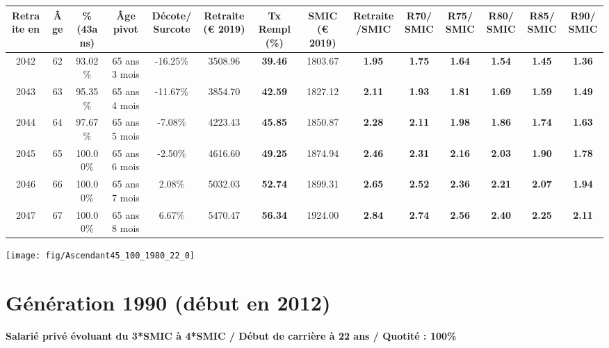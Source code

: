 \begin{adjustbox}{max width=\textwidth} 
\begin{tabular}[htb]{|c|c||c|c|c||c|c||c|c||c|c|c|c|c|} 
\hline 
 Retraite en &  Âge &  \%(43ans) &  Âge pivot &  Décote/Surcote &  Retraite (\euro{} 2019) &  Tx Rempl(\%) &  SMIC (\euro{} 2019) &  Retraite/SMIC &  R70/SMIC &  R75/SMIC &  R80/SMIC &  R85/SMIC &  R90/SMIC \\ 
\hline \hline 
 2042 &  62 &  93.02\% &  65 ans 3 mois &  -16.25\% &  3508.96 &  {\bf 39.46} &  1803.67 &  {\bf 1.95} &  {\bf 1.75} &  {\bf 1.64} &  {\bf 1.54} &  {\bf 1.45} &  {\bf 1.36} \\ 
\hline 
 2043 &  63 &  95.35\% &  65 ans 4 mois &  -11.67\% &  3854.70 &  {\bf 42.59} &  1827.12 &  {\bf 2.11} &  {\bf 1.93} &  {\bf 1.81} &  {\bf 1.69} &  {\bf 1.59} &  {\bf 1.49} \\ 
\hline 
 2044 &  64 &  97.67\% &  65 ans 5 mois &  -7.08\% &  4223.43 &  {\bf 45.85} &  1850.87 &  {\bf 2.28} &  {\bf 2.11} &  {\bf 1.98} &  {\bf 1.86} &  {\bf 1.74} &  {\bf 1.63} \\ 
\hline 
 2045 &  65 &  100.00\% &  65 ans 6 mois &  -2.50\% &  4616.60 &  {\bf 49.25} &  1874.94 &  {\bf 2.46} &  {\bf 2.31} &  {\bf 2.16} &  {\bf 2.03} &  {\bf 1.90} &  {\bf 1.78} \\ 
\hline 
 2046 &  66 &  100.00\% &  65 ans 7 mois &  2.08\% &  5032.03 &  {\bf 52.74} &  1899.31 &  {\bf 2.65} &  {\bf 2.52} &  {\bf 2.36} &  {\bf 2.21} &  {\bf 2.07} &  {\bf 1.94} \\ 
\hline 
 2047 &  67 &  100.00\% &  65 ans 8 mois &  6.67\% &  5470.47 &  {\bf 56.34} &  1924.00 &  {\bf 2.84} &  {\bf 2.74} &  {\bf 2.56} &  {\bf 2.40} &  {\bf 2.25} &  {\bf 2.11} \\ 
\hline 
\hline 
\end{tabular} 
\end{adjustbox} 
 
 \vspace{0.1cm} 

 {\hspace{-2.2cm}\texttt{[image: fig/Ascendant45\_100\_1980\_22\_0]}} 

\newpage 
 
\section{Génération 1990 (début en 2012)\label{Ascendant45_100_1990_22_0}} 
 
{\bf \noindent Salarié privé évoluant du 3*SMIC à 4*SMIC / Début de carrière à 22 ans / Quotité : 100\%}  ~ 

